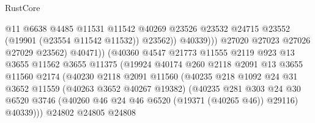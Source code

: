\begin{lexlean}{RustCore}
\begin{coremodule}
                                          @11
                                          @6638
                                          @4485
                                          @11531
                                          @11542
                                          @40269
                                          @23526
                                          @23532
                                          @24715
                                          @23552
                                          (@19901 (@23554 @11542 @11532))
                                          @23562))
                                      @40339)))
                                @27020
                                @27023
                                @27026
                                @27029
                                @23562)
                              @40471))
                          (@40360
                            @4547
                            @21773
                            @11555
                            @2119
                            @923
                            @13
                            @3655
                            @11562
                            @3655
                            @11375
                            (@19924
                              @40174
                              @260
                              @2118
                              @2091
                              @13
                              @3655
                              @11560
                              @2174
                              (@40230
                                @2118
                                @2091
                                @11560
                                (@40235
                                  @218
                                  @1092
                                  @24
                                  @31
                                  @3652
                                  @11559
                                  (@40263 @3652 @40267 @19382)
                                  (@40235
                                    @281
                                    @303
                                    @24
                                    @30
                                    @6520
                                    @3746
                                    (@40260 @46 @24 @46 @6520 (@19371 (@40265 @46)) @29116)
                                    @40339)))
                              @24802
                              @24805
                              @24808

\end{coremodule}
\end{lexlean}
